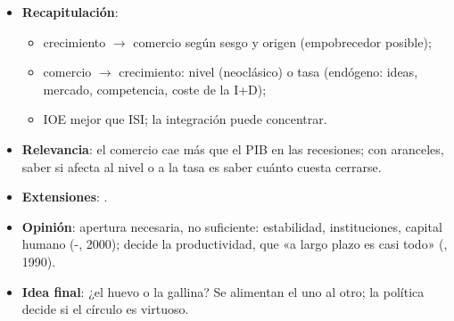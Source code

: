 \documentclass{article}
\begin{document}
\begin{columnas}
\begin{itemize}
\item \textbf{Recapitulación}:
  \begin{itemize}
  \item crecimiento $\to$ comercio según sesgo y origen (empobrecedor posible);
  \item comercio $\to$ crecimiento: nivel (neoclásico) o tasa (endógeno: ideas, mercado, competencia, coste de la I+D);
  \item IOE mejor que ISI; la integración puede concentrar.
  \end{itemize}
\item \textbf{Relevancia}: el comercio cae más que el PIB en las recesiones; con aranceles, saber si afecta al nivel o a la tasa es saber cuánto cuesta cerrarse.
\item \textbf{Extensiones}:        .
\item \textbf{Opinión}: apertura necesaria, no suficiente: estabilidad, instituciones, capital humano (-, 2000); decide la productividad, que «a largo plazo es casi todo» (, 1990).
\item \textbf{Idea final}: ¿el huevo o la gallina? Se alimentan el uno al otro; la política decide si el círculo es virtuoso.
\end{itemize}


\end{columnas}
\end{document}
